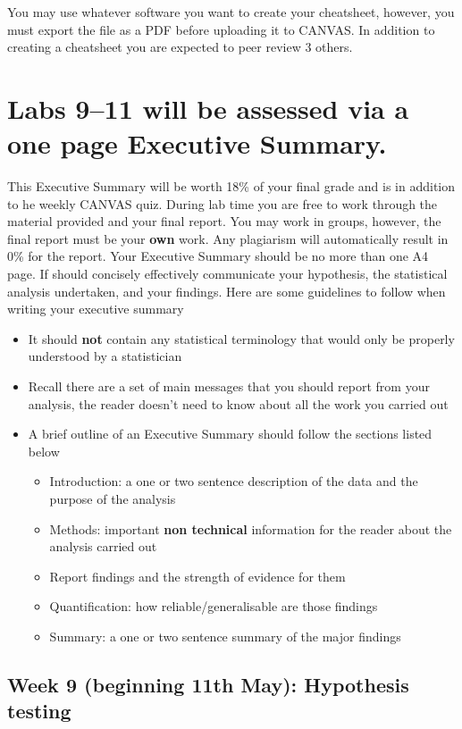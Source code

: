 \documentclass{article}
\begin{document}
You may use whatever software you want to create your cheatsheet, however, you must export the file as a PDF before uploading it to CANVAS. In addition to creating a cheatsheet you are expected to peer review 3 others.

\newpage

\section*{Labs 9--11 will be assessed via a one page Executive Summary.}

This Executive Summary will be worth  18\% of your final grade and is in addition to he weekly CANVAS quiz. During lab time you are free to work through the material provided and your final report. You may work in groups, however, the final report must be your \textbf{own} work. Any plagiarism will automatically result in 0\% for the report. Your Executive Summary should be no more than one A4 page. If should concisely effectively communicate your hypothesis, the statistical analysis undertaken, and your findings. Here are some guidelines to follow when writing your executive summary
\begin{itemize}
\item  It should \textbf{not} contain any statistical terminology that would only be properly understood by a statistician
  \item Recall there are a set of main messages that you should report from your analysis, the reader doesn't need to know about all the work you carried out
\item A brief outline of an Executive Summary should follow the sections listed below
  \begin{itemize}
\item Introduction: a one or two sentence description of the data and the purpose of the analysis
\item Methods: important \textbf{non technical} information for the reader about the analysis carried out
\item Report findings and the strength of evidence for them
\item Quantification: how reliable/generalisable are those findings
  \item Summary: a one or two sentence summary of the major findings
  \end{itemize}
\end{itemize}

\newpage

\subsection*{Week 9 (beginning 11th May): Hypothesis testing}
\end{document}

